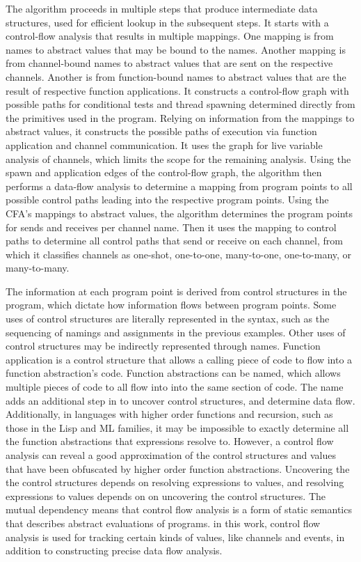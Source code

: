 \documentclass[10pt]{article}
\begin{document}
The algorithm proceeds in multiple steps that produce intermediate data structures, used for
efficient lookup in the subsequent steps.  It starts with a control-flow analysis \cite{} that
results in multiple mappings. One mapping is from names to abstract values that may be bound to
the names. Another mapping is from channel-bound names to abstract values that are
sent on the respective channels. Another is from function-bound names to abstract values
that are the result of respective function applications.  It constructs a control-flow graph 
with possible paths for conditional tests and thread spawning determined directly from the
primitives used in the program.  Relying on information from the mappings to abstract values,
it constructs the possible paths of execution via function application and channel
communication.  It uses the graph for live variable analysis of channels, which limits the
scope for the remaining analysis.  Using the spawn and application edges of the control-flow
graph, the algorithm then performs a data-flow analysis to determine a mapping from program
points to all possible control paths leading into the respective program points.  Using the
CFA's mappings to abstract values, the algorithm determines the program points for sends and
receives per channel name.  Then it uses the mapping to control paths to determine all
control paths that send or receive on each channel, from which it classifies channels as
one-shot, one-to-one, many-to-one, one-to-many, or many-to-many.




The information at each program point is derived from control structures in the program, which
dictate how information flows between program points. Some uses of control structures are
literally represented in the syntax, such as the sequencing of namings and assignments in the
previous examples. Other uses of control structures may be indirectly represented through
names. Function application is a control structure that allows a calling piece of code to
flow into a function abstraction's code.  Function abstractions can be named, which allows
multiple pieces of code to all flow into into the same section of code. The name adds an
additional step in to uncover control structures, and determine data flow.
Additionally, in languages with higher order functions and recursion, such as those in the Lisp
and ML families, it may be impossible to exactly determine all the function abstractions that
expressions resolve to. However, a control flow analysis can reveal a good
approximation of the control structures and values that have been obfuscated by higher order
function abstractions.  Uncovering the the control structures depends on resolving expressions
to values, and resolving expressions to values depends on on uncovering the control
structures. The mutual dependency means that control flow analysis is a form of
static semantics that describes abstract evaluations of programs. in this work, control flow
analysis is used for tracking certain kinds of values, like channels and events, in addition to
constructing precise data flow analysis. 
\end{document}
